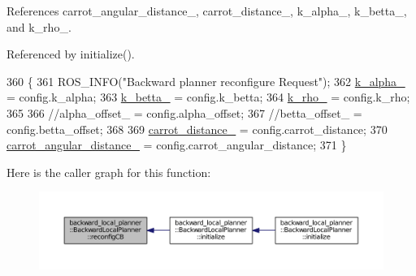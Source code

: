 References carrot\+\_\+angular\+\_\+distance\+\_\+, carrot\+\_\+distance\+\_\+, k\+\_\+alpha\+\_\+, k\+\_\+betta\+\_\+, and k\+\_\+rho\+\_\+.



Referenced by initialize().


\begin{DoxyCode}
360 \{
361     ROS\_INFO(\textcolor{stringliteral}{"Backward planner reconfigure Request"});
362     \hyperlink{classbackward__local__planner_1_1BackwardLocalPlanner_ab8a4ea2b7fe9f21c07acac7121d4dd3e}{k\_alpha\_} = config.k\_alpha;
363     \hyperlink{classbackward__local__planner_1_1BackwardLocalPlanner_a655def0b0657ac145737cd72229ad82a}{k\_betta\_} = config.k\_betta;
364     \hyperlink{classbackward__local__planner_1_1BackwardLocalPlanner_a4060acf69c2590984eb87d8e04a82699}{k\_rho\_} = config.k\_rho;
365 
366     \textcolor{comment}{//alpha\_offset\_ = config.alpha\_offset;}
367     \textcolor{comment}{//betta\_offset\_ = config.betta\_offset;}
368 
369     \hyperlink{classbackward__local__planner_1_1BackwardLocalPlanner_a969063a163a35ad5c234d03a77528657}{carrot\_distance\_} = config.carrot\_distance;
370     \hyperlink{classbackward__local__planner_1_1BackwardLocalPlanner_adcfcc43316a79db09f6c09b8e2a482b6}{carrot\_angular\_distance\_} = config.carrot\_angular\_distance;
371 \}
\end{DoxyCode}


Here is the caller graph for this function\+:
\nopagebreak
\begin{figure}[H]
\begin{center}
\leavevmode
\includegraphics[width=350pt]{classbackward__local__planner_1_1BackwardLocalPlanner_a116e148e13ab1b290f241035c72f93b1_icgraph}
\end{center}
\end{figure}



